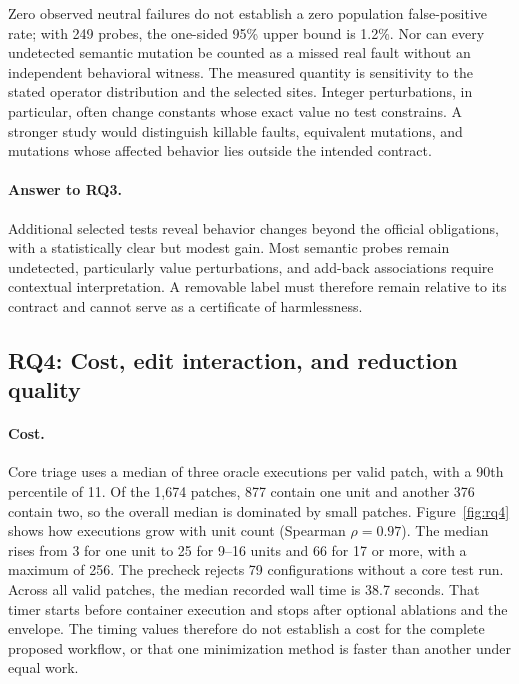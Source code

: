 \documentclass[a4paper,fleqn]{cas-sc}
\begin{document}
Zero observed neutral failures do not establish a zero population false-positive rate; with 249 probes, the one-sided 95\% upper bound is 1.2\%. Nor can every undetected semantic mutation be counted as a missed real fault without an independent behavioral witness. The measured quantity is sensitivity to the stated operator distribution and the selected sites. Integer perturbations, in particular, often change constants whose exact value no test constrains. A stronger study would distinguish killable faults, equivalent mutations, and mutations whose affected behavior lies outside the intended contract.

\paragraph{Answer to RQ3.}
Additional selected tests reveal behavior changes beyond the official obligations, with a statistically clear but modest gain. Most semantic probes remain undetected, particularly value perturbations, and add-back associations require contextual interpretation. A removable label must therefore remain relative to its contract and cannot serve as a certificate of harmlessness.

\subsection{RQ4: Cost, edit interaction, and reduction quality}\label{sec:rq4}

\paragraph{Cost.}
Core triage uses a median of three oracle executions per valid patch, with a 90th percentile of 11. Of the 1,674 patches, 877 contain one unit and another 376 contain two, so the overall median is dominated by small patches. Figure~\ref{fig:rq4} shows how executions grow with unit count (Spearman $\rho=0.97$). The median rises from 3 for one unit to 25 for 9--16 units and 66 for 17 or more, with a maximum of 256. The precheck rejects 79 configurations without a core test run. Across all valid patches, the median recorded wall time is 38.7 seconds. That timer starts before container execution and stops after optional ablations and the envelope. The timing values therefore do not establish a cost for the complete proposed workflow, or that one minimization method is faster than another under equal work.
\end{document}

